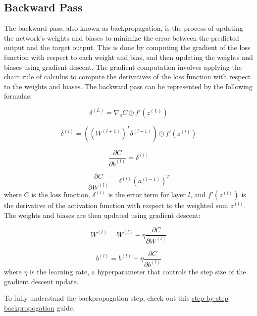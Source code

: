 \documentclass[12pt]{article}
\begin{document}
\subsection{Backward Pass}
The backward pass, also known as backpropagation, is the process of updating the network's weights and biases to minimize the error between the predicted output and the target output. This is done by computing the gradient of the loss function with respect to each weight and bias, and then updating the weights and biases using gradient descent. The gradient computation involves applying the chain rule of calculus to compute the derivatives of the loss function with respect to the weights and biases. The backward pass can be represented by the following formulas:

\begin{equation}
\delta^{(L)} = \nabla_a C \odot f'(z^{(L)})
\end{equation}

\begin{equation}
\delta^{(l)} = ((W^{(l+1)})^T \delta^{(l+1)}) \odot f'(z^{(l)})
\end{equation}

\begin{equation}
\frac{\partial C}{\partial b^{(l)}} = \delta^{(l)}
\end{equation}

\begin{equation}
\frac{\partial C}{\partial W^{(l)}} = \delta^{(l)} (a^{(l-1)})^T
\end{equation}
where $C$ is the loss function, $\delta^{(l)}$ is the error term for layer $l$, and $f'(z^{(l)})$ is the derivative of the activation function with respect to the weighted sum $z^{(l)}$. The weights and biases are then updated using gradient descent:

\begin{equation}
W^{(l)} = W^{(l)} - \eta \frac{\partial C}{\partial W^{(l)}}
\end{equation}

\begin{equation}
b^{(l)} = b^{(l)} - \eta \frac{\partial C}{\partial b^{(l)}}
\end{equation}
where $\eta$ is the learning rate, a hyperparameter that controls the step size of the gradient descent update.

To fully understand the backpropagation step, check out this \href{https://hmkcode.com/ai/backpropagation-step-by-step/}{step-by-step backpropogation} guide.
\end{document}
